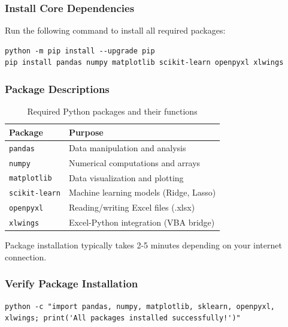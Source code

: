 \documentclass[11pt,a4paper]{article}
\begin{document}
\subsubsection{Install Core Dependencies}

Run the following command to install all required packages:

\begin{commandbox}[title=Package Installation]
\begin{lstlisting}[style=shellstyle]
python -m pip install --upgrade pip
pip install pandas numpy matplotlib scikit-learn openpyxl xlwings
\end{lstlisting}
\end{commandbox}

\subsubsection{Package Descriptions}

\begin{table}[h]
\centering
\begin{tabular}{@{} l p{8cm} @{}}
\toprule
\textbf{Package} & \textbf{Purpose} \\
\midrule
\texttt{pandas} & Data manipulation and analysis \\
\texttt{numpy} & Numerical computations and arrays \\
\texttt{matplotlib} & Data visualization and plotting \\
\texttt{scikit-learn} & Machine learning models (Ridge, Lasso) \\
\texttt{openpyxl} & Reading/writing Excel files (.xlsx) \\
\texttt{xlwings} & Excel-Python integration (VBA bridge) \\
\bottomrule
\end{tabular}
\caption{Required Python packages and their functions}
\end{table}

\begin{infobox}[title=Installation Time]
Package installation typically takes 2-5 minutes depending on your internet connection.
\end{infobox}

\subsubsection{Verify Package Installation}

\begin{commandbox}[title=Verification Script]
\begin{lstlisting}[style=shellstyle]
python -c "import pandas, numpy, matplotlib, sklearn, openpyxl, xlwings; print('All packages installed successfully!')"
\end{lstlisting}
\end{commandbox}
\end{document}
